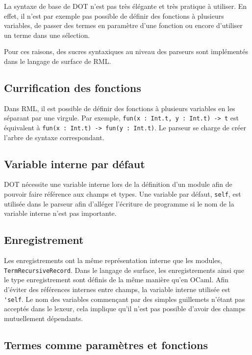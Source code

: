 La syntaxe de base de DOT n'est pas très élégante et très pratique à utiliser.
En effet, il n'est par exemple pas possible de définir des fonctions à plusieurs
variables, de passer des termes en paramètre d'une fonction ou encore d'utiliser
un terme dans une sélection.

Pour ces raisons, des sucres syntaxiques au niveau des parseurs sont implémentés
dans le langage de surface de RML.

\subsection*{Currification des fonctions}

Dans RML, il est possible de définir des fonctions à plusieurs variables en les
séparant par une virgule.
Par exemple, \verb|fun(x : Int.t, y : Int.t) -> t| est équivalent à
\verb|fun(x : Int.t) -> fun(y : Int.t)|. Le parseur se charge de créer l'arbre de
syntaxe correspondant.

\subsection*{Variable interne par défaut}

DOT nécessite une variable interne lors de la définition d'un module afin de
pouvoir faire référence aux champs et types. Une variable par défaut,
\verb|self|, est utilisée dans le parseur afin d'alléger l'écriture de programme
si le nom de la variable interne n'est pas importante.

\subsection*{Enregistrement}

Les enregistrements ont la même représentation interne que les modules,
\verb|TermRecursiveRecord|. Dans le langage de surface, les enregistrements
ainsi que le type enregistrement sont définis de la même manière qu'en OCaml.
Afin d'éviter des références internes entre champs, la variable interne utilisée
est \verb|'self|. Le nom des variables commençant par des simples guillemets
n'étant pas acceptés dans le lexeur, cela implique qu'il n'est pas possible
d'avoir des champs mutuellement dépendants.

\subsection*{Termes comme paramètres et fonctions}

